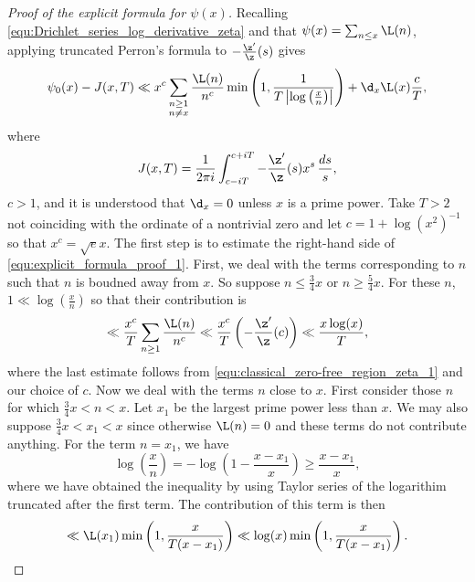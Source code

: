       \begin{proof}[Proof of the explicit formula for $\psi(x)$]
        Recalling \cref{equ:Drichlet_series_log_derivative_zeta} and that $\psi(x) = \sum_{n \le x}\L(n)$, applying truncated Perron's formula to $-\frac{\z'}{\z}(s)$ gives
        \begin{equation}\label{equ:explicit_formula_proof_1}
          \psi_{0}(x)-J(x,T) \ll x^{c}\sum_{\substack{n \ge 1 \\ n \neq x}}\frac{\L(n)}{n^{c}}\min\left(1,\frac{1}{T\left|\log\left(\frac{x}{n}\right)\right|}\right)+\d_{x}\L(x)\frac{c}{T},
        \end{equation}
        where
        \[
          J(x,T) = \frac{1}{2\pi i}\int_{c-iT}^{c+iT}-\frac{\z'}{\z}(s)x^{s}\,\frac{ds}{s},
        \]
        $c > 1$, and it is understood that $\d_{x} = 0$ unless $x$ is a prime power. Take $T > 2$ not coinciding with the ordinate of a nontrivial zero and let $c = 1+\log(x^{2})^{-1}$ so that $x^{c} = \sqrt{e}x$. The first step is to estimate the right-hand side of \cref{equ:explicit_formula_proof_1}. First, we deal with the terms corresponding to $n$ such that $n$ is boudned away from $x$. So suppose $n \le \frac{3}{4}x$ or $n \ge \frac{5}{4}x$. For these $n$, $1 \ll \log\left(\frac{x}{n}\right)$ so that their contribution is
        \begin{equation}\label{equ:explicit_formula_proof_2}
          \ll \frac{x^{c}}{T}\sum_{n \ge 1}\frac{\L(n)}{n^{c}} \ll \frac{x^{c}}{T}\left(-\frac{\z'}{\z}(c)\right) \ll \frac{x\log(x)}{T},
        \end{equation}
        where the last estimate follows from \cref{equ:classical_zero-free_region_zeta_1} and our choice of $c$. Now we deal with the terms $n$ close to $x$. First consider those $n$ for which $\frac{3}{4}x < n < x$. Let $x_{1}$ be the largest prime power less than $x$. We may also suppose $\frac{3}{4}x < x_{1} < x$ since otherwise $\L(n) = 0$ and these terms do not contribute anything. For the term $n = x_{1}$, we have
        \[
          \log\left(\frac{x}{n}\right) = -\log\left(1-\frac{x-x_{1}}{x}\right) \ge \frac{x-x_{1}}{x},
        \]
        where we have obtained the inequality by using Taylor series of the logarithim truncated after the first term. The contribution of this term is then
        \begin{equation}\label{equ:explicit_formula_proof_3}
          \ll \L(x_{1})\min\left(1,\frac{x}{T(x-x_{1})}\right) \ll \log(x)\min\left(1,\frac{x}{T(x-x_{1})}\right).
        \end{equation}

\end{proof}
